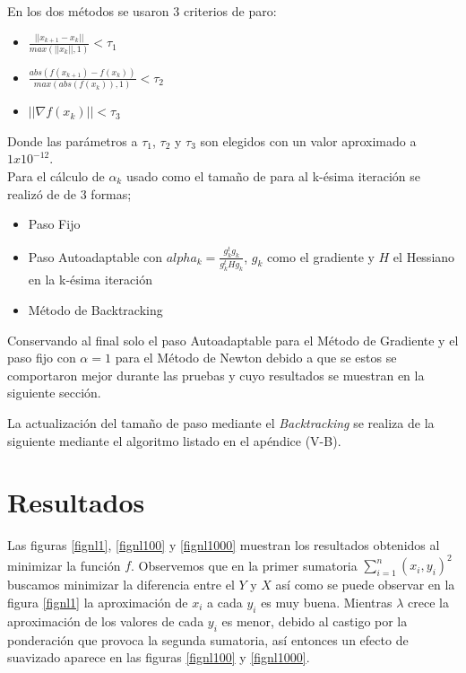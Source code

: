 \documentclass[conference]{IEEEtran}
\begin{document}
En los dos métodos se usaron 3 criterios de paro:

\begin{itemize}
	\item $\frac{||x_{k+1} - x_{k}||}{max(||x_k||, 1)} < \tau_1$
	\item $\frac{abs(f(x_{k+1}) - f(x_{k}))}{max(abs(f(x_k)), 1)} < \tau_2$
	\item $||\nabla f(x_k)|| < \tau_3$
\end{itemize}

Donde las parámetros a $\tau_1$, $\tau_2$ y $\tau_3$ son elegidos con un valor
aproximado a $1x10^{-12}$. \\

Para el cálculo de $\alpha_k$ usado como el tamaño de para al k-ésima iteración
se realizó de de 3 formas;

\begin{itemize}
	\item Paso Fijo
	\item Paso Autoadaptable con $alpha_k = \frac{g_k^tg_k}{g_k^tHg_k}$, $g_k$ como el gradiente y $H$ el Hessiano en la k-ésima iteración
	\item Método de Backtracking
\end{itemize}

Conservando al final solo el paso Autoadaptable para el Método de
Gradiente y el paso fijo con $\alpha=1$ para el Método de Newton debido a que
se estos se comportaron mejor durante las pruebas y cuyo resultados se muestran
en la siguiente sección.

La actualización del tamaño de paso mediante el \textit{Backtracking} se realiza
de la siguiente mediante el algoritmo listado en el apéndice (V-B).

\section{Resultados}

Las figuras \ref{fignl1}, \ref{fignl100} y \ref{fignl1000} muestran los resultados
obtenidos al minimizar la función $f$. Observemos que en la primer sumatoria
$\sum_{i=1}^{n} (x_i , y_i)^2$ buscamos minimizar la diferencia entre el $Y$ y $X$
así como se puede observar en la figura \ref{fignl1} la aproximación de $x_i$ a
cada $y_i$ es muy buena. Mientras $\lambda$ crece la aproximación de los valores
de cada $y_i$ es menor, debido al castigo por la ponderación que provoca la
segunda sumatoria, así entonces un efecto de suavizado aparece en las figuras
\ref{fignl100} y \ref{fignl1000}.
\end{document}
